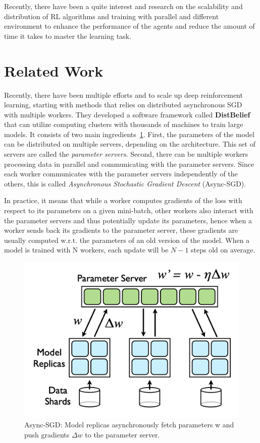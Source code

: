 Recently, there have been a quite interest and research on the scalability and distribution of RL algorithms and training with parallel and different environment to enhance the performance of the agents and reduce the amount of time it takes to master the learning task.

\section{Related Work}

Recently, there have been multiple efforts and to scale up deep reinforcement learning, starting with methods that relies on distributed asynchronous SGD~\parencite{dean2012large} with multiple workers. They developed a software framework
called \textbf{DistBelief} that can utilize computing clusters with thousands of machines to train large models. It consists of two main ingredients~\ref{fig:sgd}. First, the parameters of the model can be distributed on multiple servers, depending on the architecture. This set of servers are called the \textit{parameter
servers}. Second, there can be multiple workers processing data in parallel and communicating with the parameter servers. Since each worker communicates with the parameter servers independently of the others, this is
called \textit{Asynchronous Stochastic Gradient Descent} (Async-SGD).

In practice, it means that while a worker computes gradients of the loss with respect to its parameters on a given mini-batch, other workers also interact with the parameter servers and thus potentially update its parameters, hence when a worker sends back its gradients to the parameter server, these gradients are usually computed w.r.t. the parameters of an old version of the model. When a model is trained with N workers, each update will be $N-1$ steps old on average.

\begin{figure}[H]
    \centering
    \includegraphics[width=0.7\linewidth]{figures/algos/sgd.png}
    \caption{Async-SGD: Model replicas asynchronously fetch parameters w and push gradients \(\Delta w\) to the parameter server.}
    \label{fig:sgd}
\end{figure}


